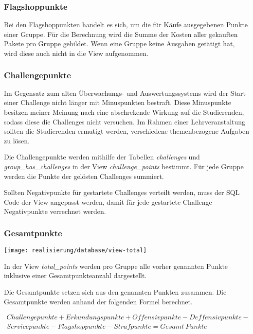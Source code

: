 \subsubsection{Flagshoppunkte}
Bei den Flagshoppunkten handelt es sich, um die für Käufe ausgegebenen Punkte einer Gruppe.
Für die Berechnung wird die Summe der Kosten aller gekauften Pakete pro Gruppe gebildet.
Wenn eine Gruppe keine Ausgaben getätigt hat, wird diese auch nicht in die View aufgenommen.

\subsubsection{Challengepunkte}
Im Gegensatz zum alten Überwachungs- und Auswertungssystems wird der Start einer Challenge nicht länger mit Minuspunkten bestraft. Diese Minuspunkte besitzen meiner Meinung nach eine abschrekende Wirkung auf die Studierenden, sodass diese die Challenges nicht versuchen. Im Rahmen einer Lehrveranstaltung sollten die Studierenden ermutigt werden, verschiedene themenbezogene Aufgaben zu lösen.

Die Challengepunkte werden mithilfe der Tabellen \textit{challenges} und \textit{group\_has\_challenges} in der View \textit{challenge\_points} bestimmt. Für jede Gruppe werden die Punkte der gelösten Challenges summiert.

Sollten Negativpunkte für gestartete Challenges verteilt werden, muss der SQL Code der View angepasst werden, damit für jede gestartete Challenge Negativpunkte verrechnet werden. 

\subsubsection{Gesamtpunkte}
\begin{center}
	\texttt{[image: realisierung/database/view-total]}
	\label{fig:realisierung-view-total}
\end{center}

In der View \textit{total\_points} werden pro Gruppe alle vorher genannten Punkte inklusive einer Gesamtpunkteanzahl dargestellt. 

Die Gesamtpunkte setzen sich aus den genannten Punkten zusammen. Die Gesamtpunkte werden anhand der folgenden Formel berechnet.

\begin{multline*}
Challengepunkte + Erkundungspunkte + Offensivpunkte - Deffensivpunkte - \\ Servicepunkte - Flagshoppunkte - Strafpunkte = Gesamt~Punkte
\end{multline*}


